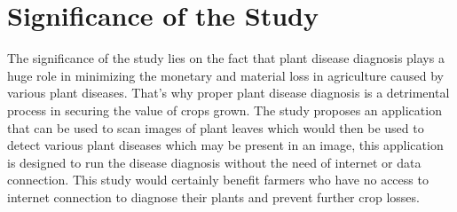 \section{Significance of the Study}
The significance of the study lies on the
fact that plant disease diagnosis plays a huge role 
in minimizing the monetary and material loss in
agriculture caused by various plant diseases.  
That’s why proper plant disease diagnosis is a
detrimental process in securing the value of 
crops grown. The study proposes an application 
that can be used to scan images of plant leaves 
which would then be used to detect various plant 
diseases which may be present in an image, this 
application is designed to run the disease diagnosis 
without the need of internet or data connection.
This study would certainly benefit farmers who 
have no access to internet connection to diagnose
their plants and prevent further crop losses. 


